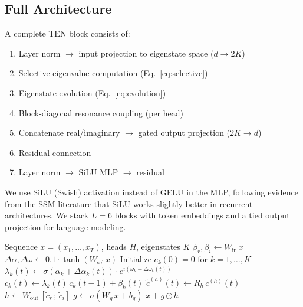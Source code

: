 \documentclass{article}
\begin{document}
\subsection{Full Architecture}

A complete TEN block consists of:
\begin{enumerate}[nosep]
\item Layer norm $\to$ input projection to eigenstate space ($d \to 2K$)
\item Selective eigenvalue computation (Eq.~\ref{eq:selective})
\item Eigenstate evolution (Eq.~\ref{eq:evolution})
\item Block-diagonal resonance coupling (per head)
\item Concatenate real/imaginary $\to$ gated output projection ($2K \to d$)
\item Residual connection
\item Layer norm $\to$ SiLU MLP $\to$ residual
\end{enumerate}

We use SiLU (Swish) activation instead of GELU in the MLP, following evidence from the SSM literature that SiLU works slightly better in recurrent architectures. We stack $L = 6$ blocks with token embeddings and a tied output projection for language modeling.

\begin{algorithm}
\caption{TEN Forward Pass (with selectivity and gating)}
\begin{algorithmic}[1]
\REQUIRE Sequence $x = (x_1, \ldots, x_T)$, heads $H$, eigenstates $K$
\STATE $\beta_r, \beta_i \gets W_{\text{in}} \, x$ 
\STATE $\Delta\alpha, \Delta\omega \gets 0.1 \cdot \tanh(W_{\text{sel}} \, x)$ 
\STATE Initialize $c_k(0) = 0$ for $k = 1, \ldots, K$
  \STATE $\lambda_k(t) \gets \sigma(\alpha_k + \Delta\alpha_k(t)) \cdot e^{i(\omega_k + \Delta\omega_k(t))}$
  \STATE $c_k(t) \gets \lambda_k(t) \, c_k(t\!-\!1) + \beta_k(t)$ 
    \STATE $\tilde{c}^{(h)}(t) \gets R_h \, c^{(h)}(t)$ 
  \ENDFOR
\ENDFOR
\STATE $h \gets W_{\text{out}} \, [\tilde{c}_r \,;\, \tilde{c}_i]$ 
\STATE $g \gets \sigma(W_g \, x + b_g)$ 
\RETURN $x + g \odot h$ 
\end{algorithmic}
\end{algorithm}
\end{document}
